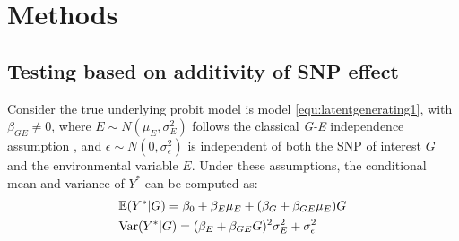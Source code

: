 

\section{Methods}\label{sec:methods}

\subsection{Testing based on additivity of SNP effect}\label{subsec:m1}
Consider the true underlying probit model is model \ref{equ:latentgenerating1}, with $\beta_{GE} \neq 0$, where $E \sim N(\mu_E,\sigma_E^2)$ follows the classical \textit{G-E} independence assumption \citep{GEdependence}, and $\epsilon\sim N(0,\sigma_\epsilon^2)$ is independent of both the SNP of interest $G$ and the environmental variable $E$. Under these assumptions, the conditional mean and variance of $Y^*$ can be computed as:
\begin{equation}\label{equ:conditionalMiss1}
\begin{aligned}
&\mathbb{E}(Y^* |G) = \beta_0 + \beta_E\mu_E + (\beta_G+\beta_{GE}\mu_E)G \\
&\text{Var}(Y^*|G) = (\beta_E + \beta_{GE}G)^2 \sigma_E^2 + \sigma_\epsilon^2
\end{aligned}
\end{equation}


